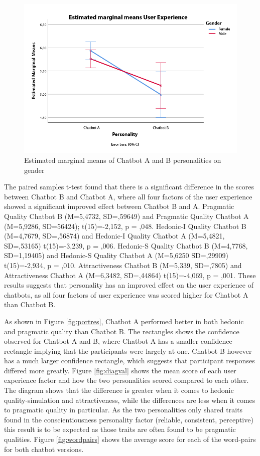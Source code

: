 \begin{figure}[H]
    \centering
    \includegraphics[scale=0.4]{figures/pers-gender.png}
    \caption{Estimated marginal means of Chatbot A and B personalities on gender}
    \label{fig:persgender}
\end{figure}

The paired samples t-test found that there is a significant difference in the scores between Chatbot B and Chatbot A, where all four factors of the user experience showed a significant improved effect between Chatbot B and A. Pragmatic Quality Chatbot B (M=5,4732, SD=,59649) and Pragmatic Quality Chatbot A (M=5,9286, SD=56424); t(15)=-2,152, p = ,048. Hedonic-I Quality Chatbot B (M=4,7679, SD=,56874) and Hedonic-I Quality Chatbot A (M=5,4821, SD=,53165) t(15)=-3,239, p = ,006. Hedonic-S Quality Chatbot B (M=4,7768, SD=1,19405) and Hedonic-S Quality Chatbot A (M=5,6250 SD=,29909) t(15)=-2,934, p = ,010. Attractiveness Chatbot B (M=5,339, SD=,7805) and Attractiveness Chatbot A (M=6,3482, SD=,44864) t(15)=-4,069, p = ,001. These results suggests that personality has an improved effect on the user experience of chatbots, as all four factors of user experience was scored higher for Chatbot A than Chatbot B.

As shown in Figure \ref{fig:portres}, Chatbot A performed better in both hedonic and pragmatic quality than Chatbot B. The rectangles shows the confidence observed for Chatbot A and B, where Chatbot A has a smaller confidence rectangle implying that the participants were largely at one. Chatbot B however has a much larger confidence rectangle, which suggests that participant responses differed more greatly. Figure \ref{fig:diagval} shows the mean score of each user experience factor and how the two personalities scored compared to each other. The diagram shows that the difference is greater when it comes to hedonic quality-simulation and attractiveness, while the differences are less when it comes to pragmatic quality in particular. As the two personalities only shared traits found in the conscientiousness personality factor (reliable, consistent, perceptive) this result is to be expected as those traits are often found to be pragmatic qualities. Figure \ref{fig:wordpairs} shows the average score for each of the word-pairs for both chatbot versions.

